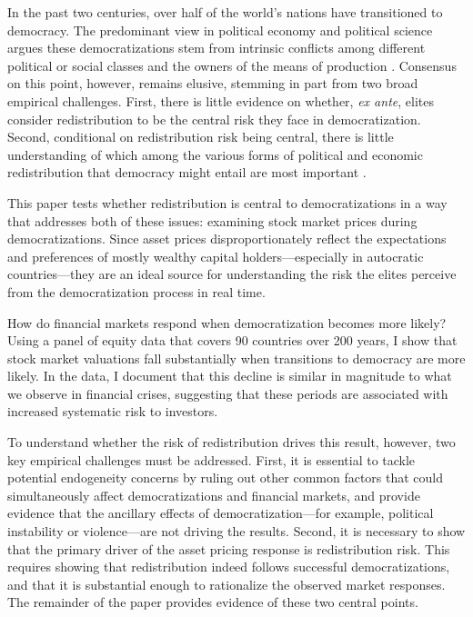 \documentclass[12pt]{article}
\numberwithin{equation}{section}
\begin{document}
In the past two centuries, over half of the world's nations have transitioned to democracy.  The predominant view in political economy and political science argues these democratizations stem from intrinsic conflicts among different political or social classes and the owners of the means of production \citep*{Marx1848,Lipset1959,Moore1966, Boix2003,Acemoglu2006,Ansell2010}.  Consensus on this point, however, remains elusive, stemming in part from two broad empirical challenges.  First, there is little evidence on whether, {\it ex ante}, elites consider redistribution to be the central risk they face in democratization. Second, conditional on redistribution risk being central,  there is little understanding of which among the various forms of political and economic redistribution that democracy might entail are most important \citep{Acemoglu2015}.

This paper tests whether redistribution is central to democratizations in a way that addresses both of these issues: examining stock market prices during democratizations. Since asset prices disproportionately reflect the expectations and preferences of mostly wealthy capital holders---especially in autocratic countries---they are an ideal source for understanding the risk the elites perceive from the democratization process in real time. 

How do financial markets respond when democratization becomes more likely? Using a panel of equity data that covers 90 countries over 200 years, I show that stock market valuations fall substantially when transitions to democracy are more likely.  In the data,  I document that this decline is similar in magnitude to what we observe in financial crises, suggesting that these periods are associated with increased systematic risk to investors.

To understand whether the risk of redistribution drives this result, however, two key empirical challenges must be addressed. First,  it is essential to tackle potential endogeneity concerns by ruling out other common factors that could simultaneously affect democratizations and financial markets, and provide evidence that the ancillary effects of democratization---for example, political instability or violence---are not driving the results. Second, it is necessary to show that the primary driver of the asset pricing response is redistribution risk. This requires showing that redistribution indeed follows successful democratizations,  and that it is substantial enough to rationalize the observed market responses.  The remainder of the paper provides evidence of these two central points.
\end{document}
